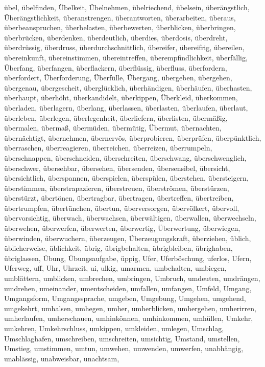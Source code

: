 \documentclass[a4paper,10pt,fleqn,twocolumn,twoside,dvipdfmx]{scrartcl}
\begin{document}
übel,
übelfinden,
Übelkeit,
Übelnehmen,
übelriechend,
übelsein,
überängstlich,
Überängstlichkeit,
überanstrengen,
überantworten,
überarbeiten,
überaus,
überbeanspruchen,
überbelasten,
überbewerten,
überblicken,
überbringen,
überbrücken,
überdenken,
überdeutlich,
überdies,
überdosis,
überdreht,
überdrüssig,
überdruss,
überdurchschnittlich,
übereifer,
übereifrig,
übereilen,
übereinkunft,
übereinstimmen,
übereintreffen,
überempfindlichkeit,
überfällig,
Überfang,
überfangen,
überflackern,
überflüssig,
überfluss,
überfordern,
überfordert,
Überforderung,
Überfülle,
Übergang,
übergeben,
übergehen,
übergenau,
übergescheit,
überglücklich,
überhändigen,
überhäufen,
überhasten,
überhaupt,
überhöht,
überkandidelt,
überkippen,
Überkleid,
überkommen,
überladen,
überlagern,
überlang,
überlassen,
überlasten,
überlaufen,
überlaut,
überleben,
überlegen,
überlegenheit,
überliefern,
überlisten,
übermäßig,
übermalen,
übermaß,
übermüden,
übermütig,
Übermut,
übernachten,
übernächtigt,
übernehmen,
übernervös,
überprobieren,
überprüfen,
überpünktlich,
überraschen,
überreagieren,
überreichen,
überreizen,
überrumpeln,
überschnappen,
überschneiden,
überschreiten,
überschwang,
überschwenglich,
überschwer,
übersehbar,
übersehen,
übersenden,
übersensibel,
übersicht,
übersichtlich,
überspannen,
überspielen,
überspülen,
überstehen,
übersteigern,
überstimmen,
überstrapazieren,
überstreuen,
überströmen,
überstürzen,
überstürzt,
übertönen,
übertragbar,
übertragen,
übertreffen,
übertreiben,
übertrumpfen,
übertünchen,
übertun,
überversorgen,
übervölkert,
übervoll,
übervorsichtig,
überwach,
überwachsen,
überwältigen,
überwallen,
überwechseln,
überwehen,
überwerfen,
überwerten,
überwertig,
Überwertung,
überwiegen,
überwinden,
überwuchern,
überzeugen,
Überzeugungskraft,
überziehen,
üblich,
üblicherweise,
üblichkeit,
übrig,
übrigbehalten,
übrigbleiben,
übrighaben,
übriglassen,
Übung,
Übungsaufgabe,
üppig,
Ufer,
Uferböschung,
uferlos,
Ufern,
Uferweg,
uff,
Uhr,
Uhrzeit,
ui,
ulkig,
umarmen,
umbehalten,
umbiegen,
umblättern,
umblicken,
umbrechen,
umbringen,
Umbruch,
umdeuten,
umdrängen,
umdrehen,
umeinander,
umentscheiden,
umfallen,
umfangen,
Umfeld,
Umgang,
Umgangsform,
Umgangssprache,
umgeben,
Umgebung,
Umgehen,
umgehend,
umgekehrt,
umhalsen,
umhegen,
umher,
umherblicken,
umhergehen,
umherirren,
umherlaufen,
umherschauen,
umhinkönnen,
umhinkommen,
umhüllen,
Umkehr,
umkehren,
Umkehrschluss,
umkippen,
umkleiden,
umlegen,
Umschlag,
Umschlaghafen,
umschreiben,
umschreiten,
umsichtig,
Umstand,
umstellen,
Umstieg,
umstimmen,
umtun,
umwehen,
umwenden,
umwerfen,
unabhängig,
unablässig,
unabweisbar,
unachtsam,
\end{document}
